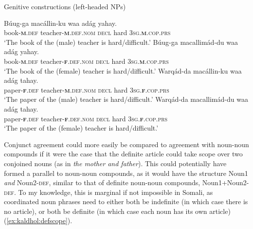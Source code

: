 \documentclass[output=paper]{langscibook}
\begin{document}
\ea\label{ex:kaldhol:NNphrase}
	Genitive constructions (left-headed NPs)
	\begin{xlist}
		\ex
		\gll Búug-ga macállin-ku waa adág yahay.\\
		book-\textsc{\textbf{m}.def} teacher-\textsc{\textbf{m}.def.nom} \textsc{decl} hard \textsc{3sg.\textbf{m}}.\textsc{cop.prs}\\
		\glt `The book of the (male) teacher is hard/difficult.'
		\ex
		\gll Búug-ga macallimád-du waa adág yahay.\\
		book-\textsc{\textbf{m}.def} teacher-\textsc{\textbf{f}.def.nom} \textsc{decl} hard \textsc{3sg.\textbf{m}}.\textsc{cop.prs}\\
		\glt `The book of the (female) teacher is hard/difficult.'
		\ex
		\gll Warqád-da macállin-ku waa adág tahay.\\
		paper-\textsc{\textbf{f}.def} teacher-\textsc{\textbf{m}.def.nom} \textsc{decl} hard \textsc{3sg.\textbf{f}}.\textsc{cop.prs}\\
		\glt `The paper of the (male) teacher is hard/difficult.'
		\ex
		\gll Warqád-da macallimád-du waa adág tahay.\\
		paper-\textsc{\textbf{f}.def} teacher-\textsc{\textbf{f}.def.nom} \textsc{decl} hard \textsc{3sg.\textbf{f}}.\textsc{cop.prs}\\
		\glt `The paper of the (female) teacher is hard/difficult.'
	\end{xlist}
\z
Conjunct agreement could more easily be compared to agreement with noun-noun compounds if it were the case that the definite article could take scope over two conjoined nouns (as in \textit{the mother and father}). This could potentially have formed a parallel to noun-noun compounds, as it would have the structure Noun1 \textit{and} Noun2-\textsc{def}, similar to that of definite noun-noun compounds, Noun1+Noun2-\textsc{def}. To my knowledge, this is marginal if not impossible in Somali, as coordinated noun phrases need to either both be indefinite (in which case there is no article), or both be definite (in which case each noun has its own article) (\ref{ex:kaldhol:defscope}).
\end{document}
